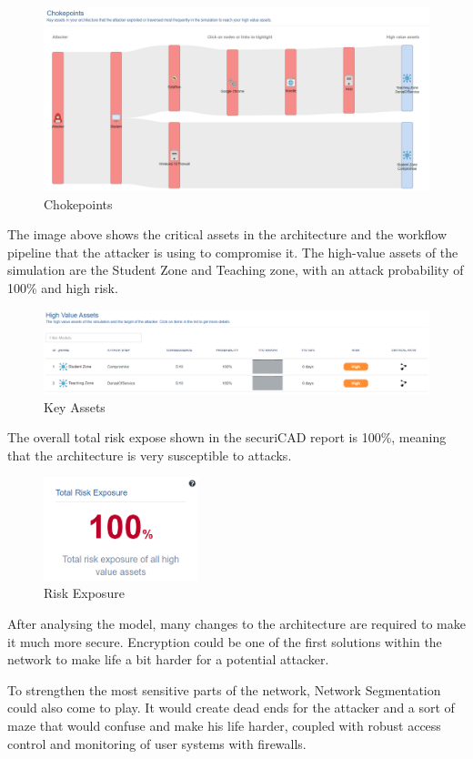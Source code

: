 \begin{figure}[H]
  \centering
  \includegraphics[width=1\textwidth]{figures/chokepoints}
  \caption{Chokepoints}
  \label{f:chokepoints}
\end{figure}
The image above shows the critical assets in the architecture and the workflow
pipeline that the attacker is using to compromise it. The high-value assets of
the simulation are the Student Zone and Teaching zone, with an attack
probability of 100\% and high risk.

\begin{figure}[H]
  \centering
  \includegraphics[width=1\textwidth]{figures/key-assets}
  \caption{Key Assets}
  \label{f:key-assets}
\end{figure}

The overall total risk expose shown in the securiCAD report is 100\%, meaning
that the architecture is very susceptible to attacks.

\begin{figure}[H]
  \centering
  \includegraphics[width=0.4\textwidth]{figures/risk-exposure}
  \caption{Risk Exposure}
  \label{f:risk-exposure}
\end{figure}

After analysing the model, many changes to the architecture are required to
make it much more secure. Encryption could be one of the first solutions within
the network to make life a bit harder for a potential attacker.

To strengthen the most sensitive parts of the network, Network Segmentation
could also come to play. It would create dead ends for the attacker and a sort
of maze that would confuse and make his life harder, coupled with robust access
control and monitoring of user systems with firewalls.
